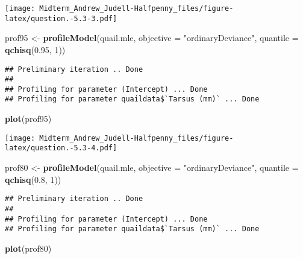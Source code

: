 \documentclass[]{article}
\newenvironment{Shaded}{\begin{snugshade}}{\end{snugshade}}
\newcommand{\KeywordTok}[1]{\textcolor[rgb]{0.13,0.29,0.53}{\textbf{#1}}}
\newcommand{\DataTypeTok}[1]{\textcolor[rgb]{0.13,0.29,0.53}{#1}}
\newcommand{\DecValTok}[1]{\textcolor[rgb]{0.00,0.00,0.81}{#1}}
\newcommand{\FloatTok}[1]{\textcolor[rgb]{0.00,0.00,0.81}{#1}}
\newcommand{\StringTok}[1]{\textcolor[rgb]{0.31,0.60,0.02}{#1}}
\newcommand{\NormalTok}[1]{#1}
\begin{document}
\texttt{[image: Midterm\_Andrew\_Judell-Halfpenny\_files/figure-latex/question.-5.3-3.pdf]}

\begin{Shaded}
\begin{Highlighting}[]
\NormalTok{prof95 <-}\StringTok{ }\KeywordTok{profileModel}\NormalTok{(quail.mle,}
                     \DataTypeTok{objective =} \StringTok{"ordinaryDeviance"}\NormalTok{,}
                     \DataTypeTok{quantile =} \KeywordTok{qchisq}\NormalTok{(}\FloatTok{0.95}\NormalTok{, }\DecValTok{1}\NormalTok{))}
\end{Highlighting}
\end{Shaded}

\begin{verbatim}
## Preliminary iteration .. Done
## 
## Profiling for parameter (Intercept) ... Done
## Profiling for parameter quaildata$`Tarsus (mm)` ... Done
\end{verbatim}

\begin{Shaded}
\begin{Highlighting}[]
\KeywordTok{plot}\NormalTok{(prof95)}
\end{Highlighting}
\end{Shaded}

\texttt{[image: Midterm\_Andrew\_Judell-Halfpenny\_files/figure-latex/question.-5.3-4.pdf]}

\begin{Shaded}
\begin{Highlighting}[]
\NormalTok{prof80 <-}\StringTok{ }\KeywordTok{profileModel}\NormalTok{(quail.mle,}
                     \DataTypeTok{objective =} \StringTok{"ordinaryDeviance"}\NormalTok{,}
                     \DataTypeTok{quantile =} \KeywordTok{qchisq}\NormalTok{(}\FloatTok{0.8}\NormalTok{, }\DecValTok{1}\NormalTok{))}
\end{Highlighting}
\end{Shaded}

\begin{verbatim}
## Preliminary iteration .. Done
## 
## Profiling for parameter (Intercept) ... Done
## Profiling for parameter quaildata$`Tarsus (mm)` ... Done
\end{verbatim}

\begin{Shaded}
\begin{Highlighting}[]
\KeywordTok{plot}\NormalTok{(prof80)}
\end{Highlighting}
\end{Shaded}
\end{document}
